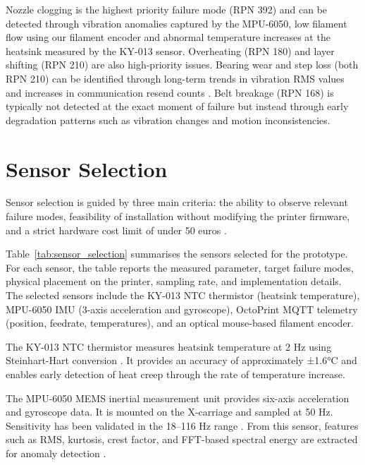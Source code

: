 Nozzle clogging is the highest priority failure mode (RPN 392) and can be detected through vibration anomalies captured by the MPU-6050, low filament flow using our filament encoder and abnormal temperature increases at the heatsink measured by the KY-013 sensor. Overheating (RPN 180) and layer shifting (RPN 210) are also high-priority issues. Bearing wear and step loss (both RPN 210) can be identified through long-term trends in vibration RMS values and increases in communication resend counts \cite{randall2011vibration}. Belt breakage (RPN 168) is typically not detected at the exact moment of failure but instead through early degradation patterns such as vibration changes and motion inconsistencies.

\section{Sensor Selection}

Sensor selection is guided by three main criteria: the ability to observe relevant failure modes, feasibility of installation without modifying the printer firmware, and a strict hardware cost limit of under 50 euros \cite{shomenov2025}.

Table~\ref{tab:sensor_selection} summarises the sensors selected for the prototype. For each sensor, the table reports the measured parameter, target failure modes, physical placement on the printer, sampling rate, and implementation details. The selected sensors include the KY-013 NTC thermistor (heatsink temperature), MPU-6050 IMU (3-axis acceleration and gyroscope), OctoPrint MQTT telemetry (position, feedrate, temperatures), and an optical mouse-based filament encoder.

{%
    \centering
    
    \label{tab:sensor_selection}
}

The KY-013 NTC thermistor measures heatsink temperature at 2 Hz using Steinhart-Hart conversion \cite{steinhart1968calibration}. It provides an accuracy of approximately ±1.6°C and enables early detection of heat creep through the rate of temperature increase.

The MPU-6050 MEMS inertial measurement unit provides six-axis acceleration and gyroscope data. It is mounted on the X-carriage and sampled at 50 Hz. Sensitivity has been validated in the 18--116 Hz range \cite{kiran2022sensitivity}. From this sensor, features such as RMS, kurtosis, crest factor, and FFT-based spectral energy are extracted for anomaly detection \cite{randall2011vibration}.

